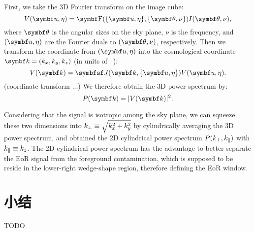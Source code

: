 First, we take the 3D Fourier transform on the image cube:
\begin{equation}
  \label{eq:ps-3d-ft}
  V(\B{u}, \eta) = \B{\R{F}}(\{\B{u}, \eta\}, \{\B{\theta}, \nu\})
    I(\B{\theta}, \nu),
\end{equation}
where $\B{\theta}$ is the angular sizes on the sky plane, $\nu$ is the
frequency, and $(\B{u}, \eta)$ are the Fourier duals to
$(\B{\theta}, \nu)$, respectively.
Then we transform the coordinate from $(\B{u}, \eta)$ into the
cosmological coordinate $\B{k} = (k_x, k_y, k_z)$
(in units of \si{\per\cMpc}):
\begin{equation}
  \label{eq:coordinate-transform}
  V(\B{k}) = \M{J}(\B{k}, \{\B{u}, \eta\}) V(\B{u}, \eta).
\end{equation}
(coordinate transform ...)
We therefore obtain the 3D power spectrum by:
\begin{equation}
  \label{eq:3d-ps}
  P(\B{k}) = |V(\B{k})|^2.
\end{equation}

Considering that the signal is isotropic among the sky plane, we can
squeeze these two dimensions into $\text{$k_{\bot}$} \equiv \sqrt{k_x^2 + k_y^2}$ by
cylindrically averaging the 3D power spectrum, and obtained the 2D
cylindrical power spectrum $P(\text{$k_{\bot}$}, \text{$k_{\parallel}$})$ with $\text{$k_{\parallel}$} \equiv k_z$.
The 2D cylindrical power spectrum has the advantage to better separate
the EoR signal from the foreground contamination, which is supposed to
be reside in the lower-right wedge-shape region, therefore defining the
EoR window.


\section{小结}

TODO


